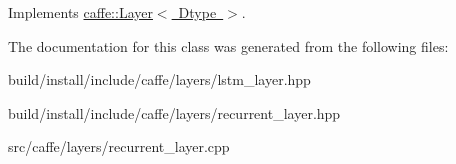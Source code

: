 Implements \mbox{\hyperlink{classcaffe_1_1_layer_a7fe981e8af8d93d587acf2a952be563d}{caffe\+::\+Layer$<$ Dtype $>$}}.



The documentation for this class was generated from the following files\+:\begin{DoxyCompactItemize}
\item 
build/install/include/caffe/layers/lstm\+\_\+layer.\+hpp\item 
build/install/include/caffe/layers/recurrent\+\_\+layer.\+hpp\item 
src/caffe/layers/recurrent\+\_\+layer.\+cpp\end{DoxyCompactItemize}
